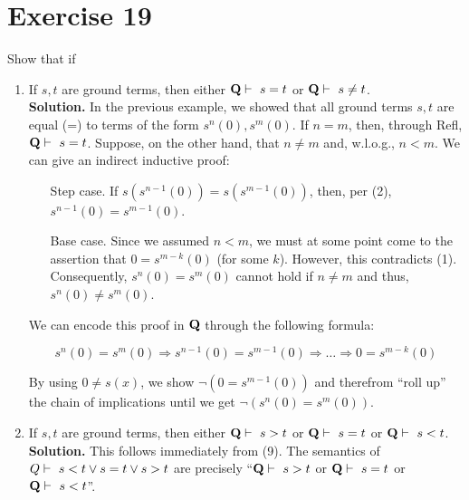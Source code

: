 \section{Exercise 19}

Show that if

\begin{enumerate}
	\item If $s,t$ are ground terms, then either $\mathbf{Q} \vdash\ s = t$ or $\mathbf{Q} \vdash\ s \neq t$.\\
	
	\textbf{Solution.} In the previous example, we showed that all ground terms $s,t$ are equal (=) to terms of the form $s^n(0), s^m(0)$. If $n = m$, then, through Refl, $\mathbf{Q} \vdash\ s = t$. Suppose, on the other hand, that $n \neq m$ and, w.l.o.g., $n < m$. We can give an indirect inductive proof:
	
	\begin{itemize}
		\item[Step case.] If $s(s^{n-1}(0)) = s(s^{m-1}(0))$, then, per (2), $s^{n-1}(0) = s^{m-1}(0)$.
		\item[Base case.] Since we assumed $n < m$, we must at some point come to the assertion that $0 = s^{m - k}(0)$ (for some $k$). However, this contradicts (1). Consequently, $s^n(0) = s^m(0)$ cannot hold if $n \neq m$ and thus, $s^n(0) \neq s^m(0)$.
	\end{itemize}
	
	We can encode this proof in $\mathbf{Q}$ through the following formula:
	
	$$
		s^n(0) = s^m(0) \Rightarrow s^{n-1}(0) = s^{m-1}(0) \Rightarrow \dots \Rightarrow 0 = s^{m-k}(0)
	$$
	
	By using $0 \neq s(x)$, we show $\neg (0 = s^{m-1}(0))$ and therefrom ``roll up'' the chain of implications until we get $\neg (s^n(0) = s^m(0))$.
	
	\item If $s,t$ are ground terms, then either $\mathbf{Q} \vdash\ s > t$ or $\mathbf{Q} \vdash\ s = t$ or $\mathbf{Q} \vdash\ s < t$.\\
	
	\textbf{Solution.} This follows immediately from (9). The semantics of $Q \vdash\ s < t \vee s = t \vee s > t$ are precisely ``$\mathbf{Q} \vdash\ s > t$ or $\mathbf{Q} \vdash\ s = t$ or $\mathbf{Q} \vdash\ s < t$''.
\end{enumerate}
